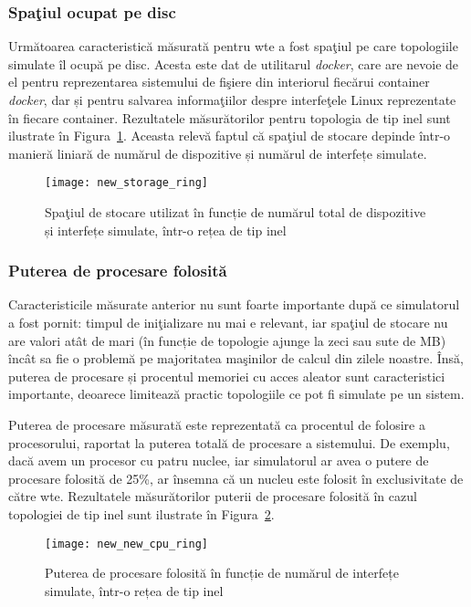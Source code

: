 \subsubsection{Spaţiul ocupat pe disc}

Următoarea caracteristică măsurată pentru \gls{wte} a fost spaţiul pe care topologiile simulate îl ocupă pe disc. Acesta este dat de utilitarul \textit{docker}, care are nevoie de el pentru reprezentarea sistemului de fişiere din interiorul fiecărui container \textit{docker}, dar și pentru salvarea informaţiilor despre interfeţele Linux reprezentate în fiecare container. Rezultatele măsurătorilor pentru topologia de tip inel sunt ilustrate în Figura~\ref{fig:new_storage_ring}. Aceasta relevă faptul că spaţiul de stocare depinde într-o manieră liniară de numărul de dispozitive și numărul de interfețe simulate.

\begin{figure}[h]
	\centering
	\texttt{[image: new\_storage\_ring]}
	\caption{Spaţiul de stocare utilizat în funcție de numărul total de dispozitive și interfețe simulate, într-o rețea de tip inel}
	\label{fig:new_storage_ring}
\end{figure}

\subsubsection{Puterea de procesare folosită}

Caracteristicile măsurate anterior nu sunt foarte importante după ce simulatorul a fost pornit: timpul de iniţializare nu mai e relevant, iar spaţiul de stocare nu are valori atât de mari (în funcție de topologie ajunge la zeci sau sute de MB) încât sa fie o problemă pe majoritatea maşinilor de calcul din zilele noastre. Însă, puterea de procesare și procentul memoriei cu acces aleator sunt caracteristici importante, deoarece limitează practic topologiile ce pot fi simulate pe un sistem.

Puterea de procesare măsurată este reprezentată ca procentul de folosire a procesorului, raportat la puterea totală de procesare a sistemului. De exemplu, dacă avem un procesor cu patru nuclee, iar simulatorul ar avea o putere de procesare folosită de 25\%, ar însemna că un nucleu este folosit în exclusivitate de către \gls{wte}. Rezultatele măsurătorilor puterii de procesare folosită în cazul topologiei de tip inel sunt ilustrate în Figura~\ref{fig:new_cpu_ring}.

\begin{figure}[h]
	\centering
	\texttt{[image: new\_new\_cpu\_ring]}
	\caption{Puterea de procesare folosită în funcție de numărul de interfețe simulate, într-o rețea de tip inel}
	\label{fig:new_cpu_ring}
\end{figure}

